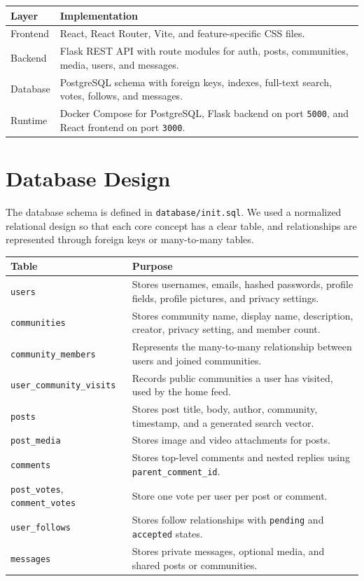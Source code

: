 \documentclass[11pt]{article}
\begin{document}
\begin{center}
\begin{tabularx}{\textwidth}{@{}lX@{}}
\toprule
\textbf{Layer} & \textbf{Implementation} \\
\midrule
Frontend & React, React Router, Vite, and feature-specific CSS files. \\
Backend & Flask REST API with route modules for auth, posts, communities, media, users, and messages. \\
Database & PostgreSQL schema with foreign keys, indexes, full-text search, votes, follows, and messages. \\
Runtime & Docker Compose for PostgreSQL, Flask backend on port \texttt{5000}, and React frontend on port \texttt{3000}. \\
\bottomrule
\end{tabularx}
\end{center}

\section{Database Design}

The database schema is defined in \texttt{database/init.sql}. We used a normalized relational design so that each core concept has a clear table, and relationships are represented through foreign keys or many-to-many tables.

\begin{center}
\small
\begin{tabularx}{\textwidth}{@{}lX@{}}
\toprule
\textbf{Table} & \textbf{Purpose} \\
\midrule
\texttt{users} & Stores usernames, emails, hashed passwords, profile fields, profile pictures, and privacy settings. \\
\texttt{communities} & Stores community name, display name, description, creator, privacy setting, and member count. \\
\texttt{community\_members} & Represents the many-to-many relationship between users and joined communities. \\
\texttt{user\_community\_visits} & Records public communities a user has visited, used by the home feed. \\
\texttt{posts} & Stores post title, body, author, community, timestamp, and a generated search vector. \\
\texttt{post\_media} & Stores image and video attachments for posts. \\
\texttt{comments} & Stores top-level comments and nested replies using \texttt{parent\_comment\_id}. \\
\texttt{post\_votes}, \texttt{comment\_votes} & Store one vote per user per post or comment. \\
\texttt{user\_follows} & Stores follow relationships with \texttt{pending} and \texttt{accepted} states. \\
\texttt{messages} & Stores private messages, optional media, and shared posts or communities. \\
\bottomrule
\end{tabularx}
\end{center}
\end{document}
